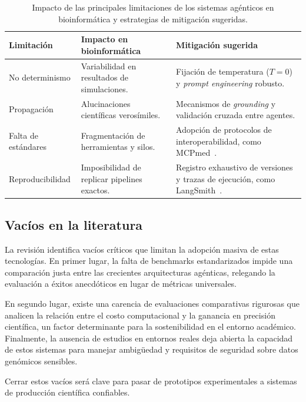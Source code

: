 \begin{table}[htbp]
  \centering
  \caption{Impacto de las principales limitaciones de los sistemas agénticos en
  bioinformática y estrategias de mitigación sugeridas.}
  \label{tab:discussion-limitations}
  \begin{tabularx}{\textwidth}{@{} l X X @{}}
    \toprule
    \textbf{Limitación} & \textbf{Impacto en bioinformática} &
    \textbf{Mitigación sugerida} \\
    \midrule
    No determinismo &
    Variabilidad en resultados de simulaciones. &
    Fijación de temperatura ($T=0$) y \textit{prompt engineering} robusto. \\
    Propagación &
    Alucinaciones científicas verosímiles. &
    Mecanismos de \textit{grounding} y validación cruzada entre agentes. \\
    Falta de estándares &
    Fragmentación de herramientas y silos. &
    Adopción de protocolos de interoperabilidad, como
    MCPmed~\citealp{41729821}. \\
    Reproducibilidad &
    Imposibilidad de replicar pipelines exactos. &
    Registro exhaustivo de versiones y trazas de ejecución, como
    LangSmith~\citealp{LangSmithObservability2026}. \\
    \bottomrule
  \end{tabularx}
\end{table}

\subsection{Vacíos en la literatura}\label{subsec:literature-gaps}

La revisión identifica vacíos críticos que limitan la adopción masiva de estas
tecnologías. En primer lugar, la falta de benchmarks estandarizados impide una
comparación justa entre las crecientes arquitecturas agénticas, relegando la
evaluación a éxitos anecdóticos en lugar de métricas universales.

En segundo lugar, existe una carencia de evaluaciones comparativas rigurosas que
analicen la relación entre el costo computacional y la ganancia en precisión
científica, un factor determinante para la sostenibilidad en el entorno
académico. Finalmente, la ausencia de estudios en entornos reales deja abierta
la capacidad de estos sistemas para manejar ambigüedad y requisitos de
seguridad sobre datos genómicos sensibles.

Cerrar estos vacíos será clave para pasar de prototipos experimentales a
sistemas de producción científica confiables.
